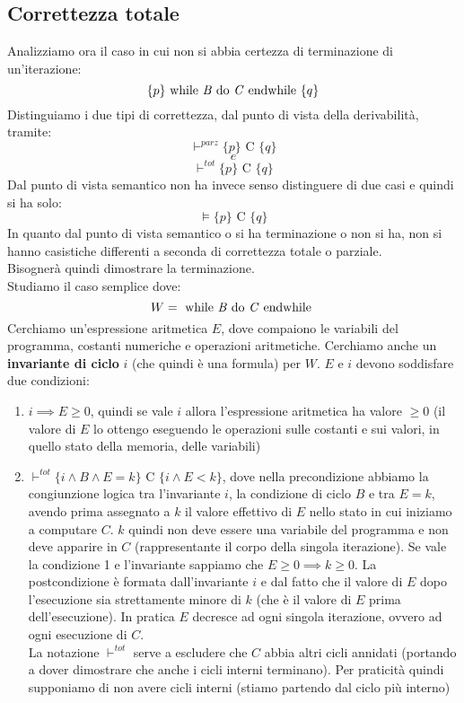 \documentclass[a4paper,12pt, oneside]{book}
\begin{document}
\subsection{Correttezza totale}
Analizziamo ora il caso in cui non si abbia certezza di terminazione di
un'iterazione:
\[\{p\}\mbox{ while \textit{B} do \textit{C} endwhile }\{q\}\]
Distinguiamo i due tipi di correttezza, dal punto di vista della derivabilità,
tramite: 
\[\vdash^{parz}\{p\}\mbox{ C }\{q\}\]
\[e\]
\[\vdash^{tot}\{p\}\mbox{ C }\{q\}\]
Dal punto di vista semantico non ha invece senso distinguere di due casi e
quindi si ha solo:
\[\vDash\{p\}\mbox{ C }\{q\}\]
In quanto dal punto di vista semantico o si ha terminazione o non si ha, non si
hanno casistiche differenti a seconda di correttezza totale o parziale.\\
Bisognerà quindi dimostrare la terminazione.\\
Studiamo il caso semplice dove:
\[W=\mbox{ while \textit{B} do \textit{C} endwhile }\]
Cerchiamo un'espressione aritmetica $E$, dove compaiono le variabili del
programma, costanti numeriche e operazioni aritmetiche. Cerchiamo anche un
\textbf{invariante di ciclo} $i$ (che quindi è una formula) per $W$. $E$ e $i$
devono soddisfare due condizioni:
\begin{enumerate}
  \item $i\implies E\geq 0$, quindi se vale $i$ allora l'espressione aritmetica
  ha valore $\geq 0$ (il valore di $E$ lo ottengo eseguendo le operazioni sulle
  costanti e sui valori, in quello stato della memoria, delle variabili)
  \item $\vdash^{tot}\{i\land B\land E=k\}\mbox{ C }\{i\land E<k\}$, dove
  nella precondizione abbiamo la congiunzione logica tra l'invariante $i$, la
  condizione di ciclo $B$ e tra $E=k$, avendo prima assegnato a $k$ il valore
  effettivo di $E$ nello stato in cui iniziamo a computare $C$. $k$ quindi non
  deve essere una variabile del programma e non deve apparire in $C$
  (rappresentante il corpo della singola iterazione). Se vale la
  condizione 1 e l'invariante sappiamo che $E\geq 0\implies k\geq 0$. La
  postcondizione è formata dall'invariante $i$ e dal fatto che il valore di $E$
  dopo l'esecuzione sia strettamente minore di $k$ (che è il valore di $E$ prima
  dell'esecuzione). In pratica $E$ decresce ad ogni singola iterazione, ovvero
  ad ogni esecuzione di $C$.\\
  La notazione $\vdash^{tot}$ serve a escludere che $C$ abbia altri cicli
  annidati (portando a dover dimostrare che anche i cicli interni
  terminano). Per praticità quindi supponiamo di non avere cicli interni (stiamo
  partendo dal ciclo più interno)
\end{enumerate}
\end{document}
